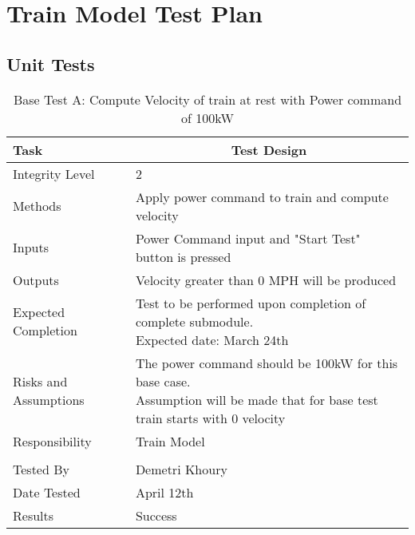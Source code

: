 \documentclass[]{article}
\begin{document}
\section{Train Model Test Plan}
\subsection{Unit Tests}
 
    \begin{table}[H]
        \centering
        \caption{Base Test A: Compute Velocity of train at rest with Power command of 100kW}
        \begin{tabular}{|l|l|}
            \hline
            Task & \multicolumn{1}{c|}{Test Design} \\ \hline
            Integrity Level & 2 \\ \hline
            Methods & Apply power command to train and compute velocity  \\ \hline
            Inputs &  Power Command input and "Start Test" button is pressed \\ \hline
            Outputs &  Velocity greater than 0 MPH will be produced  \\ \hline
            Expected Completion & \parbox[t]{10cm}{Test to be performed upon completion of complete submodule.\\ Expected date: March 24th}\\ \hline
            Risks and Assumptions & \parbox[t]{10cm}{The power command should be 100kW for this base case. \\ Assumption will be made that for base test train starts with 0 velocity} \\ \hline
            Responsibility & Train Model\\ \hline
            \\ \hline
            Tested By   &  Demetri Khoury\\	\hline
            Date Tested & \parbox[t]{10cm}{April 12th}\\ \hline
            Results & Success\\ \hline
        \end{tabular}
    \end{table}
\end{document}
